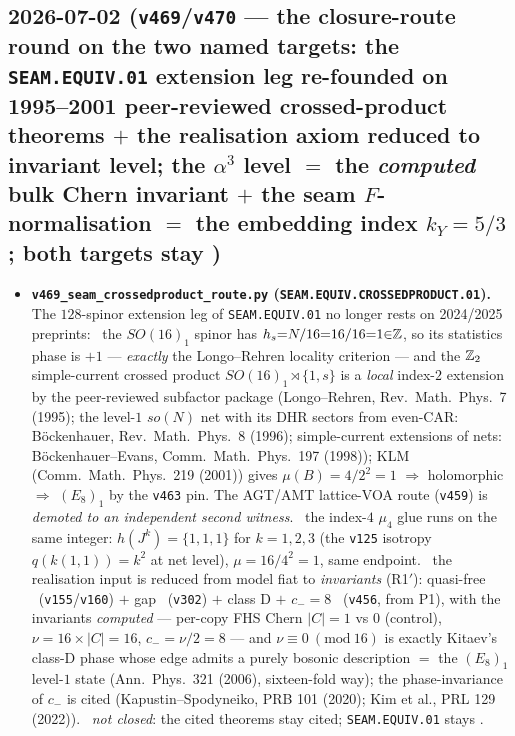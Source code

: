 \subsection*{2026-07-02 (\texttt{v469}/\texttt{v470} --- the closure-route round on the two named targets: the \texttt{SEAM.EQUIV.01} extension leg re-founded on 1995--2001 peer-reviewed crossed-product theorems $+$ the realisation axiom reduced to invariant level; the $\alpha^3$ level $=$ the \emph{computed} bulk Chern invariant $+$ the seam $F$-normalisation $=$ the embedding index $k_Y{=}5/3$; both targets stay \mO)}
\begin{itemize}
\item \textbf{\texttt{v469\_seam\_crossedproduct\_route.py} (\texttt{SEAM.EQUIV.CROSSEDPRODUCT.01}).}
The $128$-spinor extension leg of \texttt{SEAM.EQUIV.01} no longer rests on 2024/2025 preprints:
\mE\ the $SO(16)_1$ spinor has $h_s{=}N/16{=}16/16{=}1{\in}\mathbb{Z}$, so its statistics phase is $+1$ ---
\emph{exactly} the Longo--Rehren locality criterion --- and the $\mathbb{Z}_2$ simple-current crossed product
$SO(16)_1{\rtimes}\{1,s\}$ is a \emph{local} index-$2$ extension by the peer-reviewed subfactor package
(Longo--Rehren, Rev.\ Math.\ Phys.\ 7 (1995); the level-$1$ $so(N)$ net with its DHR sectors from
even-CAR: B\"ockenhauer, Rev.\ Math.\ Phys.\ 8 (1996); simple-current extensions of nets:
B\"ockenhauer--Evans, Comm.\ Math.\ Phys.\ 197 (1998)); KLM (Comm.\ Math.\ Phys.\ 219 (2001)) gives
$\mu(B){=}4/2^2{=}1$ $\Rightarrow$ holomorphic $\Rightarrow$ $(E_8)_1$ by the \texttt{v463} pin.
The AGT/AMT lattice-VOA route (\texttt{v459}) is \emph{demoted to an independent second witness}.
\mE\ the index-$4$ $\mu_4$ glue runs on the same integer: $h(J^k){=}\{1,1,1\}$ for $k{=}1,2,3$
(the \texttt{v125} isotropy $q(k(1,1)){=}k^2$ at net level), $\mu{=}16/4^2{=}1$, same endpoint.
\mE\ the realisation input is reduced from model fiat to \emph{invariants} (R1$'$): quasi-free
\mC\ (\texttt{v155}/\texttt{v160}) $+$ gap \mE\ (\texttt{v302}) $+$ class D $+$ $c_-{=}8$ \mE\
(\texttt{v456}, from P1), with the invariants \emph{computed} --- per-copy FHS Chern $|C|{=}1$ vs $0$
(control), $\nu{=}16{\times}|C|{=}16$, $c_-{=}\nu/2{=}8$ --- and $\nu\equiv 0\ (\mathrm{mod}\ 16)$ is
exactly Kitaev's class-D phase whose edge admits a purely bosonic description $=$ the $(E_8)_1$
level-$1$ state (Ann.\ Phys.\ 321 (2006), sixteen-fold way); the phase-invariance of $c_-$ is cited
(Kapustin--Spodyneiko, PRB 101 (2020); Kim et al., PRL 129 (2022)). \mO\ \emph{not closed}: the cited
theorems stay cited; \texttt{SEAM.EQUIV.01} stays \mO.

\end{itemize}
